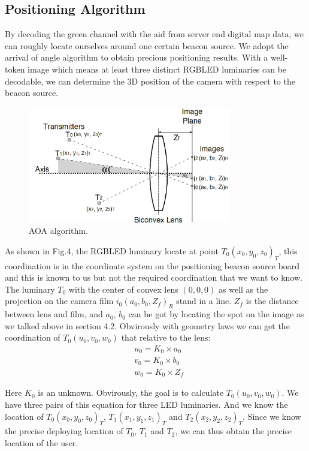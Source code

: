 \documentclass[conference]{IEEEtran}
\begin{document}
\subsection{\textbf{Positioning Algorithm}}
By decoding the green channel with the aid from server end digital map data, we can roughly locate ourselves around one certain beacon source. We adopt the arrival of angle algorithm to obtain precious positioning results. With a well-token image which means at least three distinct RGBLED luminaries can be decodable, we can determine the 3D position of the camera with respect to the beacon source.

	\begin{figure}
		\centering
		\includegraphics[width=3.5in]{../img.origin/fig4.png}
		\caption{AOA algorithm.}
		\label{fig_4}
	\end{figure}

As shown in Fig.4, the RGBLED luminary locate at point $T_0(x_0,y_0,z_0)_T$, this coordination is in the coordinate system on the positioning beacon source board and this is known to us but not the required coordination that we want to know. The luminary $T_0$ with the center of convex lens $(0,0,0)$ as well as the projection on the camera film $i_0(a_0, b_0, Z_f)_R$ stand in a line. $Z_f$ is the distance between lens and film, and $a_0$, $b_0$ can be got by locating the spot on the image as we talked above in section 4.2. Obvirously with geometry laws we can get the coordination of $T_0(u_0,v_0,w_0)$ that relative to the lens:
	\begin{equation}
	\begin{split}
	& 	u_0 = K_0 \times a_0\\	
	&	v_0 = K_0 \times b_0\\
	&	w_0 = K_0 \times Z_f
	\end{split}
	\end{equation}
	
Here $K_0$ is an unknown. Obvirously, the goal is to calculate $T_0(u_0,v_0,w_0)$. We have three pairs of this equation for three LED luminaries. And we know the location of $T_0(x_0,y_0,z_0)_T$,  $T_1(x_1,y_1,z_1)_T$ and  $T_2(x_2,y_2,z_2)_T$. Since we know the precise deploying location of $T_0$, $T_1$ and $T_2$, we can thus obtain the precise location of the user.
\end{document}
